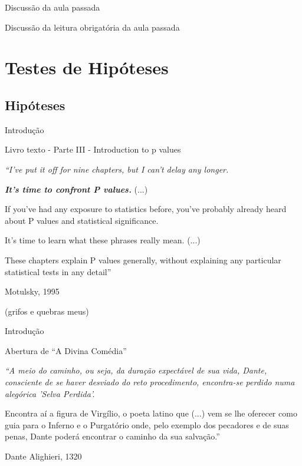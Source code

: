 \documentclass{beamer}
\begin{document}


\begin{frame}{\scriptsize Discussão da aula passada}
  \begin{block}{}
    Discussão da leitura obrigatória da aula passada
  \end{block}
\end{frame}

\section{Testes de Hipóteses}

\subsection{Hipóteses}

\begin{frame}{\scriptsize Introdução}
  \begin{block}{{\small Livro texto - Parte III - Introduction to p values}}
    \scriptsize

    {\em ``I've put it off for nine chapters, but I can't delay any
      longer.

      {\bf \em It's time to confront P values.} (...)


      \bigskip

      If you've had any exposure to statistics before, you've probably
      already heard about P values and statistical significance.

      It's time to learn what these phrases really mean. (...)

      \bigskip

      These chapters explain P values generally, without explaining
      any particular statistical tests in any detail''}
  \end{block}
  \hfill {\small Motulsky, 1995}

  \hfill {\scriptsize (grifos e quebras meus)}
\end{frame}

\begin{frame}{\scriptsize Introdução}
  \begin{block}{Abertura de ``A Divina Comédia''}
    \scriptsize
    {\em ``A meio do caminho, ou seja, da duração expectável de sua vida, Dante, consciente de se haver desviado do reto procedimento, encontra-se perdido numa alegórica 'Selva Perdida'.

      \bigskip
      Encontra aí a figura de Virgílio, o poeta latino que (...) vem se lhe oferecer como guia para o Inferno e o Purgatório onde, pelo exemplo dos pecadores e de suas penas, Dante poderá encontrar o caminho da sua salvação.''}
  \end{block}
\hfill {\small Dante Alighieri, 1320}
\end{frame}
\end{document}
